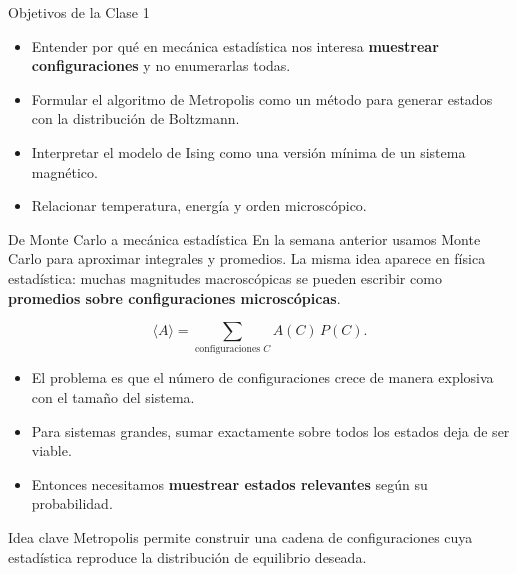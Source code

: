 \begin{frame}{Objetivos de la Clase 1}
\begin{itemize}
    \item Entender por qué en mecánica estadística nos interesa \textbf{muestrear configuraciones} y no enumerarlas todas.
    \item Formular el algoritmo de Metropolis como un método para generar estados con la distribución de Boltzmann.
    \item Interpretar el modelo de Ising como una versión mínima de un sistema magnético.
    \item Relacionar temperatura, energía y orden microscópico.
\end{itemize}
\end{frame}

\begin{frame}{De Monte Carlo a mecánica estadística}
\justifying
En la semana anterior usamos Monte Carlo para aproximar integrales y promedios.
La misma idea aparece en física estadística: muchas magnitudes macroscópicas se
pueden escribir como \textbf{promedios sobre configuraciones microscópicas}.

\begin{equation*}
\langle A \rangle = \sum_{\text{configuraciones } C} A(C)\, P(C).
\end{equation*}

\begin{itemize}
    \item El problema es que el número de configuraciones crece de manera explosiva con el tamaño del sistema.
    \item Para sistemas grandes, sumar exactamente sobre todos los estados deja de ser viable.
    \item Entonces necesitamos \textbf{muestrear estados relevantes} según su probabilidad.
\end{itemize}

\begin{alertblock}{Idea clave}
Metropolis permite construir una cadena de configuraciones cuya estadística reproduce la distribución de equilibrio deseada.
\end{alertblock}
\end{frame}

